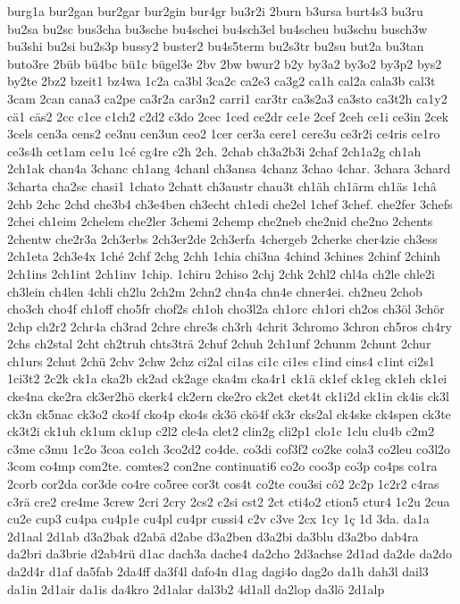 {burg1a
bur2gan
bur2gar
bur2gin
bur4gr
bu3r2i
2burn
b3ursa
burt4s3
bu3ru
bu2sa
bu2sc
bus3cha
bu3sche
bu4schei
bu4sch3el
bu4scheu
bu3schu
busch3w
bu3shi
bu2si
bu2s3p
bussy2
buster2
bu4s5term
bu2s3tr
bu2su
but2a
bu3tan
buto3re
2büb
bü4bc
bü1c
bügel3e
2bv
2bw
bwur2
b2y
by3a2
by3o2
by3p2
bys2
by2te
2bz2
bzeit1
bz4wa
1c2a
ca3bl
3ca2c
ca2e3
ca3g2
ca1h
cal2a
cala3b
cal3t
3cam
2can
cana3
ca2pe
ca3r2a
car3n2
carri1
car3tr
ca3s2a3
ca3sto
ca3t2h
ca1y2
cä1
cäs2
2cc
c1ce
c1ch2
c2d2
c3do
2cec
1ced
ce2dr
ce1e
2cef
2ceh
ce1i
ce3in
2cek
3cels
cen3a
cens2
ce3nu
cen3un
ceo2
1cer
cer3a
cere1
cere3u
ce3r2i
ce4ris
ce1ro
ce3s4h
cet1am
ce1u
1cé
cg4re
c2h
2ch.
2chab
ch3a2b3i
2chaf
2ch1a2g
ch1ah
2ch1ak
chan4a
3chanc
ch1ang
4chanl
ch3ansa
4chanz
3chao
4char.
3chara
3chard
3charta
cha2sc
chasi1
1chato
2chatt
ch3austr
chau3t
ch1äh
ch1ärm
ch1äs
1châ
2chb
2chc
2chd
che3b4
ch3e4ben
ch3echt
ch1edi
che2el
1chef
3chef.
che2fer
3chefs
2chei
ch1eim
2chelem
che2ler
3chemi
2chemp
che2neb
che2nid
che2no
2chents
2chentw
che2r3a
2ch3erbs
2ch3er2de
2ch3erfa
4chergeb
2cherke
cher4zie
ch3ess
2ch1eta
2ch3e4x
1ché
2chf
2chg
2chh
1chia
chi3na
4chind
3chines
2chinf
2chinh
2ch1ins
2ch1int
2ch1inv
1chip.
1chiru
2chiso
2chj
2chk
2chl2
chl4a
ch2le
chle2i
ch3lein
ch4len
4chli
ch2lu
2ch2m
2chn2
chn4a
chn4e
chner4ei.
ch2neu
2chob
cho3ch
cho4f
ch1off
cho5fr
chof2s
ch1oh
cho3l2a
ch1orc
ch1ori
ch2os
ch3öl
3chör
2chp
ch2r2
2chr4a
ch3rad
2chre
chre3s
ch3rh
4chrit
3chromo
3chron
ch5ros
ch4ry
2chs
ch2stal
2cht
ch2truh
chts3trä
2chuf
2chuh
2ch1unf
2chunm
2chunt
2chur
ch1urs
2chut
2chü
2chv
2chw
2chz
ci2al
ci1as
ci1c
ci1es
c1ind
cins4
c1int
ci2s1
1ci3t2
2c2k
ck1a
cka2b
ck2ad
ck2age
cka4m
cka4r1
ck1ä
ck1ef
ck1eg
ck1eh
ck1ei
cke4na
cke2ra
ck3er2hö
ckerk4
ck2ern
cke2ro
ck2et
cket4t
ck1i2d
ck1in
ck4is
ck3l
ck3n
ck5nac
ck3o2
cko4f
cko4p
cko4s
ck3ö
ckö4f
ck3r
cks2al
ck4ske
ck4spen
ck3te
ck3t2i
ck1uh
ck1um
ck1up
c2l2
cle4a
clet2
clin2g
cli2p1
clo1c
1clu
clu4b
c2m2
c3me
c3mu
1c2o
3coa
co1ch
3co2d2
co4de.
co3di
cof3f2
co2ke
cola3
co2leu
co3l2o
3com
co4mp
com2te.
comtes2
con2ne
continuati6
co2o
coo3p
co3p
co4ps
co1ra
2corb
cor2da
cor3de
co4re
co5ree
cor3t
cos4t
co2te
cou3si
cô2
2c2p
1c2r2
c4ras
c3rä
cre2
cre4me
3crew
2cri
2cry
2cs2
c2si
cst2
2ct
cti4o2
ction5
ctur4
1c2u
2cua
cu2e
cup3
cu4pa
cu4p1e
cu4pl
cu4pr
cussi4
c2v
c3ve
2cx
1cy
1ç
1d
3da.
da1a
2d1aal
2d1ab
d3a2bak
d2abä
d2abe
d3a2ben
d3a2bi
da3blu
d3a2bo
dab4ra
da2bri
da3brie
d2ab4rü
d1ac
dach3a
dache4
da2cho
2d3achse
2d1ad
da2de
da2do
da2d4r
d1af
da5fab
2da4ff
da3f4l
dafo4n
d1ag
dagi4o
dag2o
da1h
dah3l
dail3
da1in
2d1air
da1is
da4kro
2d1alar
dal3b2
4d1all
da2lop
da3lö
2d1alp
}
